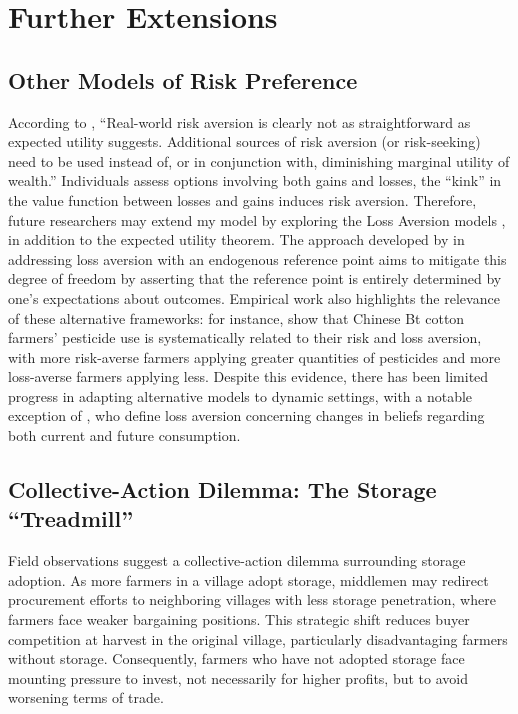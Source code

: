 

\section{Further Extensions}

\subsection{Other Models of Risk Preference}
\noindent According to \cite{o2018modeling}, ``Real-world risk aversion is clearly not as straightforward as expected utility suggests. Additional sources of risk aversion (or risk-seeking) need to be used instead of, or in conjunction with, diminishing marginal utility of wealth.'' Individuals assess options involving both gains and losses, the ``kink'' in the value function between losses and gains induces risk aversion. Therefore, future researchers may extend my model by exploring the Loss Aversion models \citep{kahneman1979prospect}, in addition to the expected utility theorem. The approach developed by \cite{kHoszegi2006model, kHoszegi2007reference, kHoszegi2009reference} in addressing loss aversion with an endogenous reference point aims to mitigate this degree of freedom by asserting that the reference point is entirely determined by one's expectations about outcomes. Empirical work also highlights the relevance of these alternative frameworks: for instance, \cite{liu2013risk} show that Chinese Bt cotton farmers’ pesticide use is systematically related to their risk and loss aversion, with more risk-averse farmers applying greater quantities of pesticides and more loss-averse farmers applying less. Despite this evidence, there has been limited progress in adapting alternative models to dynamic settings, with a notable exception of \cite{kHoszegi2009reference}, who define loss aversion concerning changes in beliefs regarding both current and future consumption.



\subsection{Collective-Action Dilemma: The Storage ``Treadmill''}
\noindent Field observations suggest a collective-action dilemma surrounding storage adoption. As more farmers in a village adopt storage, middlemen may redirect procurement efforts to neighboring villages with less storage penetration, where farmers face weaker bargaining positions. This strategic shift reduces buyer competition at harvest in the original village, particularly disadvantaging farmers without storage. Consequently, farmers who have not adopted storage face mounting pressure to invest, not necessarily for higher profits, but to avoid worsening terms of trade. 

